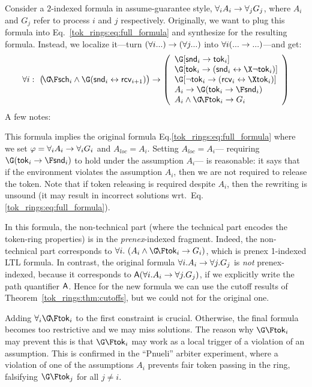 Consider a $2$-indexed formula in assume-guarantee style,
$\forall_i A_i \rightarrow \forall_j G_j$,
where $A_i$ and $G_j$ refer to process $i$ and $j$ respectively.
Originally,
we want to plug this formula into Eq.~\ref{tok_rings:eq:full_formula}
and synthesize for the resulting formula.
Instead,
we localize it---turn $(\forall i...) \rightarrow (\forall j...)$ into $\forall i (... \rightarrow ...)$---and get:
\begin{equation}\label{tok_rings:eq:localised}
\forall i:~ \big(\!\GF\sch_i \land \G(\tsnd_i \iff \trcv_{i+1})\big)
\impl
  \left(
   \begin{array}{l}
     \G [\tsnd_i \impl \token_i] \\
     \G [\token_i \impl (\tsnd_i \iff \X\neg\token_i)] \\
     \G [\neg\token_i \impl (\trcv_i \iff \X\token_i)] \\
     A_i \impl \G(\token_i \impl \F \tsnd_i) \\
     A_i \land \GF \token_i \impl G_i
   \end{array}
   \right)
\end{equation}
A few notes:
\li

\- This formula implies the original formula Eq.\ref{tok_rings:eq:full_formula}
   where we set $\varphi = \forall_i A_i \rightarrow \forall_i G_i$ and $A_{loc}=A_i$.
   Setting $A_{loc} = A_i$---%
   requiring $\G(\token_i \impl \F \tsnd_i)$ to hold under the assumption $A_i$---%
   is reasonable:
   it says that if the environment violates the assumption $A_i$,
   then we are not required to release the token.
   Note that if token releasing is required despite $A_i$,
   then the rewriting is unsound
   (it may result in incorrect solutions wrt.\ Eq.\ref{tok_rings:eq:full_formula}).

\- In this formula,
   the non-technical part (where the technical part encodes the token-ring properties)
   is in the \emph{prenex}-indexed fragment.
   Indeed, the non-technical part corresponds to $\forall i.~(A_i \land \GF\token_i \impl G_i)$,
   which is prenex 1-indexed LTL formula.
   In contrast, the original formula $\forall i.A_i \rightarrow \forall j.G_j$ is \emph{not} prenex-indexed,
   because it corresponds to ${\operatorname{\mathsf{A}}}(\forall i.A_i \rightarrow \forall j.G_j)$,
   if we explicitly write the path quantifier ${\operatorname{\mathsf{A}}}$.
   Hence for the new formula we can use the cutoff results of Theorem~\ref{tok_rings:thm:cutoffs},
   but we could not for the original one.

\- Adding $\forall_i \GF\token_i$ to the first constraint is crucial.
   Otherwise,
   the final formula becomes too restrictive and we may miss solutions.
   The reason why $\G\F\token_i$ may prevent this is that
   $\G\F\token_i$ may work as a local trigger of a violation of an assumption.
   This is confirmed in the ``Pnueli'' arbiter experiment,
   where a violation of one of the assumptions $A_i$ prevents fair token passing in the ring,
   falsifying $\G\F\token_j$ for all $j\neq i$.

